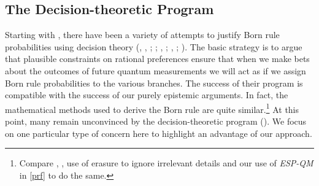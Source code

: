 \documentclass[onecolumn,secnumarabic,amsmath,amssymb,balancelastpage,nofootinbib]{article}
\begin{document}
\subsection{The Decision-theoretic Program}

Starting with \citep{deutsch1999}, there have been a variety of attempts to justify Born rule probabilities using decision theory (\citeauthor{greaves2004}, \citeyear{greaves2004}, \citeyear{greaves2007b}; \citealp{greavesM}; \citeauthor{wallace2003b}, \citeyear{wallace2003b}; \citeyear{wallace2010b}, \citeyear{wallace2012}; \citealp{wilson2013objective}).  The basic strategy is to argue that plausible constraints on rational preferences ensure that when we make bets about the outcomes of future quantum measurements we will act as if we assign Born rule probabilities to the various branches.  The success of their program is compatible with the success of our purely epistemic arguments.  In fact, the mathematical methods used to derive the Born rule are quite similar.\footnote{Compare , \citeyear[]{wallace2012}, use of erasure to ignore irrelevant details and our use of \emph{ESP-QM} in \textsection \ref{prf} to do the same.}  At this point, many remain unconvinced by the decision-theoretic program (\citealp{baker2007, albert2010, price2010, dizadji2013, maudlinreview}).  We focus on one particular type of concern here to highlight an advantage of our approach.
\end{document}
